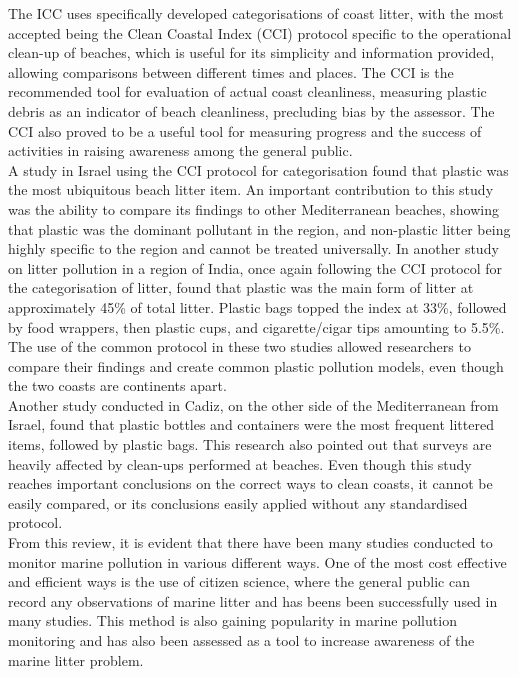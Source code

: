 \documentclass[10pt]{article}\usepackage[]{graphicx}\usepackage[]{color}
\begin{document}
The ICC uses specifically developed categorisations of coast litter, with the most accepted being the Clean Coastal Index (CCI) protocol specific to the operational clean-up of beaches, which is useful for its simplicity and information provided, allowing comparisons between different times and places. The CCI is the recommended tool for evaluation of actual coast cleanliness, measuring plastic debris as an indicator of beach cleanliness, precluding bias by the assessor. The CCI also proved to be a useful tool for measuring progress and the success of activities in raising awareness among the general public. \cite{ALKALAY2007} \\

A study in Israel using the CCI protocol for categorisation found that plastic was the most ubiquitous beach litter item. An important contribution to this study was the ability to compare its findings to other Mediterranean beaches, showing that plastic was the dominant pollutant in the region, and non-plastic litter being highly specific to the region and cannot be treated universally. \cite{PORTMAN2017} In another study on litter pollution in a region of India, once again following the CCI protocol for the categorisation of litter, found that plastic was the main form of litter at approximately 45\% of total litter. Plastic bags topped the index at 33\%, followed by food wrappers, then plastic cups, and cigarette/cigar tips amounting to 5.5\%. \cite{KUMAR2016} The use of the common protocol in these two studies allowed researchers to compare their findings and create common plastic pollution models, even though the two coasts are continents apart. \\

Another study conducted in Cadiz, on the other side of the Mediterranean from Israel, found that plastic bottles and containers were the most frequent littered items, followed by plastic bags. This research also pointed out that surveys are heavily affected by clean-ups performed at beaches. \cite{WILLIAMS2016} Even though this study reaches important conclusions on the correct ways to clean coasts, it cannot be easily compared, or its conclusions easily applied without any standardised protocol. \\

From this review, it is evident that there have been many studies conducted to monitor marine pollution in various different ways. One of the most cost effective and efficient ways is the use of citizen science, where the general public can record any observations of marine litter \cite{EARP2019} and has beens been successfully used in many studies. \cite{ROY2012} \cite{FORRESTER2015} This method is also gaining popularity in marine pollution monitoring \cite{BRAVO2009} \cite{CARSON2012} \cite{HIDALGORUZ2017} \cite{BAUERCIVIELLO2018} and has also been assessed as a tool to increase awareness of the marine litter problem. \cite{LOCRITANI2019} \\
\end{document}
